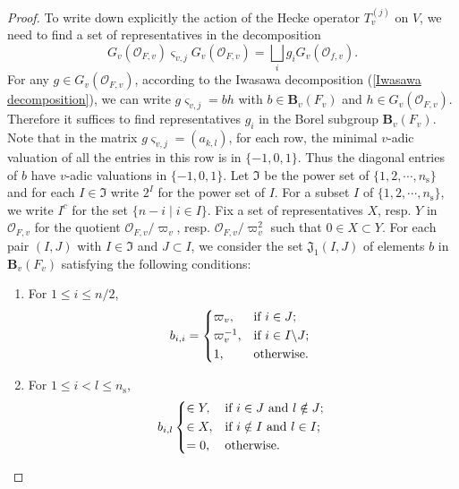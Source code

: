 \documentclass[12pt,oneside,reqno]{amsart}
\theoremstyle{plain}
\begin{document}
\begin{proof}
		To write down explicitly the action of the Hecke operator $T_v^{(j)}$ on
		$V$, we need to find a set of representatives in the decomposition
		\[
		G_v(\mathcal{O}_{F,v})
		\varsigma_{v,j}
		G_v(\mathcal{O}_{F,v})
		=
		\bigsqcup_ig_i G_v(\mathcal{O}_{f,v}).
		\]
		For any $g\in G_v(\mathcal{O}_{F,v})$, according to the Iwasawa decomposition (\ref{Iwasawa decomposition}), we can write
		$g\varsigma_{v,j}=bh$ with $b\in\mathbf{B}_v(F_v)$ and $h\in G_v(\mathcal{O}_{F,v})$. Therefore it suffices to find representatives $g_i$
		in the Borel subgroup $\mathbf{B}_v(F_v)$. Note that in the matrix
		$g\varsigma_{v,j}=(a_{k,l})$, for each row, the minimal $v$-adic valuation
		of all the entries in this row is in $\{-1,0,1\}$. Thus the diagonal entries of
		$b$ have $v$-adic valuations in	$\{-1,0,1\}$. Let $\mathfrak{I}$ be the power set of $\{1,2,\cdots,n_\mathrm{s}\}$ and for each $I\in\mathfrak{I}$ write
		$2^I$ for the power set of $I$. For a subset $I$ of $\{1,2,\cdots,n_\mathrm{s}\}$, we write $I^c$ for the set $\{n-i\mid i\in I\}$.
		Fix a set of representatives $X$, resp. $Y$ in $\mathcal{O}_{F,v}$ for the quotient $\mathcal{O}_{F,v}/\varpi_v$, resp. $\mathcal{O}_{F,v}/\varpi_v^2$
		such that $0\in X \subset Y$. For each pair $(I,J)$ with $I\in\mathfrak{I}$ and
		$J\subset I$, we consider the set $\mathfrak{J}_1(I,J)$ of elements $b$ in
		$\mathbf{B}_v(F_v)$ satisfying the following conditions:
		\begin{enumerate}
			\item 
			For $1\leq i\leq n/2$,
			\[
			b_{i,i}
			=
			\begin{cases*}
				\varpi_v,
				&
				if
				$i\in J$;
				\\
				\varpi_v^{-1},
				&
				if
				$i\in I\backslash J$;
				\\
				1,
				&
				otherwise.
			\end{cases*}
			\]
			
			
			
			\item 
			For $1\leq i<l\leq n_\mathrm{s}$,
			\[
			b_{i,l}
			\begin{cases*}
				\in
				Y,
				&
				if
				$i\in J$
				and $l\notin J$;
				\\
				\in
				X,
				&
				if
				$i\notin I$
				and $l\in I$;
				\\
				=0,
				&
				otherwise.
			\end{cases*}
			\]
			

\end{enumerate}
\end{proof}
\end{document}
